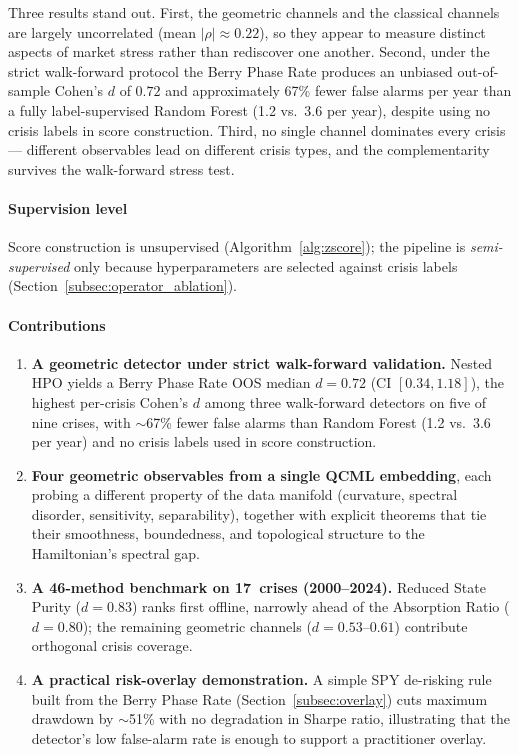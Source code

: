 \documentclass[3p]{elsarticle}
\begin{document}
Three results stand out.  First, the geometric channels and the
classical channels are largely uncorrelated (mean $|\rho| \approx
0.22$), so they appear to measure distinct aspects of market stress
rather than rediscover one another.  Second, under the strict
walk-forward protocol the Berry Phase Rate produces an unbiased
out-of-sample Cohen's $d$ of $0.72$ and approximately 67\% fewer
false alarms per year than a fully label-supervised Random Forest
(1.2 vs.\ 3.6 per year), despite using no crisis labels in score
construction.  Third, no single channel dominates every crisis---
different observables lead on different crisis types, and the
complementarity survives the walk-forward stress test.

\paragraph{Supervision level}
Score construction is unsupervised (Algorithm~\ref{alg:zscore});
the pipeline is \emph{semi-supervised} only because hyperparameters
are selected against crisis labels
(Section~\ref{subsec:operator_ablation}).

\paragraph{Contributions}
\begin{enumerate}
\item \textbf{A geometric detector under strict walk-forward
  validation.}  Nested HPO yields a Berry Phase Rate OOS median
  $d = 0.72$ (CI $[0.34, 1.18]$), the highest per-crisis Cohen's
  $d$ among three walk-forward detectors on five of nine crises,
  with $\sim$67\% fewer false alarms than Random Forest (1.2 vs.\
  3.6 per year) and no crisis labels used in score construction.

\item \textbf{Four geometric observables from a single QCML
  embedding}, each probing a different property of the data
  manifold (curvature, spectral disorder, sensitivity,
  separability), together with explicit theorems that tie their
  smoothness, boundedness, and topological structure to the
  Hamiltonian's spectral gap.

\item \textbf{A 46-method benchmark on 17~crises (2000--2024).}
  Reduced State Purity ($d = 0.83$) ranks first offline, narrowly
  ahead of the Absorption Ratio ($d = 0.80$); the remaining
  geometric channels ($d = 0.53$--$0.61$) contribute orthogonal
  crisis coverage.

\item \textbf{A practical risk-overlay demonstration.}  A simple
  SPY de-risking rule built from the Berry Phase Rate
  (Section~\ref{subsec:overlay}) cuts maximum drawdown by $\sim$51\%
  with no degradation in Sharpe ratio, illustrating that the
  detector's low false-alarm rate is enough to support a
  practitioner overlay.
\end{enumerate}
\end{document}
